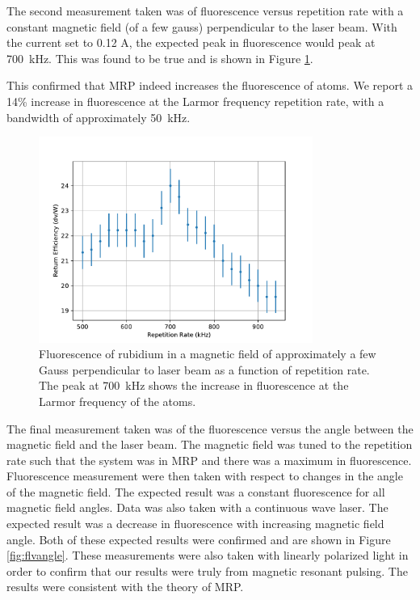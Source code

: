 \documentclass[]{revtex4}
\begin{document}
The second measurement taken was of fluorescence versus repetition rate with a constant magnetic field (of a few gauss) perpendicular to the laser beam. With the current set to 0.12 A, the expected peak in fluorescence would peak at \SI{700}{ kHz}. This was found to be true and is shown in Figure \ref{fig:flvrep}.

This confirmed that MRP indeed increases the fluorescence of atoms. We report a 14\% increase in fluorescence at the Larmor frequency repetition rate, with a bandwidth of approximately \SI{50}{ kHz}.

\begin{figure}[ht]
	\centering
	\includegraphics[width=0.8\textwidth]{../FullPaper/../../MRPData/MAR24/FLvRep.pdf}
	\caption{Fluorescence of rubidium in a magnetic field of approximately a few Gauss perpendicular to laser beam as a function of repetition rate. The peak at \SI{700}{ kHz} shows the increase in fluorescence at the Larmor frequency of the atoms.}
	\label{fig:flvrep}
\end{figure}


The final measurement taken was of the fluorescence versus the angle between the magnetic field and the laser beam. The magnetic field was tuned to the repetition rate such that the system was in MRP and there was a maximum in fluorescence. Fluorescence measurement were then taken with respect to changes in the angle of the magnetic field. The expected result was a constant fluorescence for all magnetic field angles. Data was also taken with a continuous wave laser. The expected result was a decrease in fluorescence with increasing magnetic field angle. Both of these expected results were confirmed and are shown in Figure \ref{fig:flvangle}. These measurements were also taken with linearly polarized light in order to confirm that our results were truly from magnetic resonant pulsing. The results were consistent with the theory of MRP.
\end{document}
